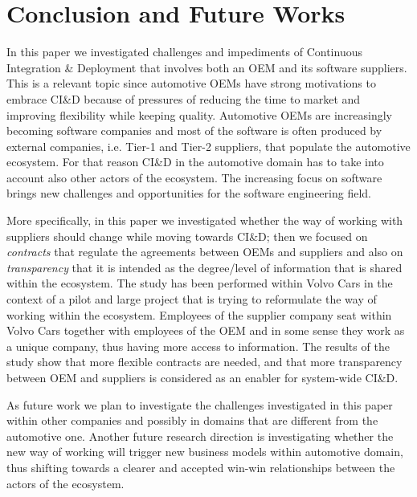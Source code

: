 \section{Conclusion and Future Works}\label{sec:conclusion}

In this paper we investigated challenges and impediments of Continuous Integration \& Deployment that involves both an OEM and its software suppliers.
This is a relevant topic since automotive OEMs have strong motivations to embrace CI\&D because of pressures of reducing the time to market and improving flexibility while keeping quality. Automotive OEMs are increasingly becoming software companies and most of the software is often produced by external companies, i.e. Tier-1 and Tier-2 suppliers, that populate the automotive ecosystem. 
For that reason CI\&D in the automotive domain has to take into account also other actors of the ecosystem.  The increasing focus on software brings new challenges and opportunities for the software engineering field. 

More specifically, in this paper we investigated whether the way of working with suppliers should change while moving towards CI\&D; then we focused on {\em contracts} that regulate the agreements between OEMs and suppliers and also  
on {\em transparency} that it is intended as the degree/level of information that is shared within the ecosystem. 
The study has been performed within Volvo Cars in the context of a pilot and large project that is trying to reformulate the way of working within the ecosystem. Employees of the supplier company seat within Volvo Cars together with employees of the OEM and in some sense they work as a unique company, thus having more access to information. 
The results of the study show that more flexible contracts are needed, and that more transparency between OEM and suppliers is considered as an enabler for system-wide CI\&D. 

As future work we plan to investigate the challenges investigated in this paper within other companies and possibly in domains that are different from the automotive one. Another future research direction is  investigating whether the new way of working will trigger new business models within automotive domain, thus shifting towards a clearer and accepted win-win relationships between the actors of the ecosystem.
